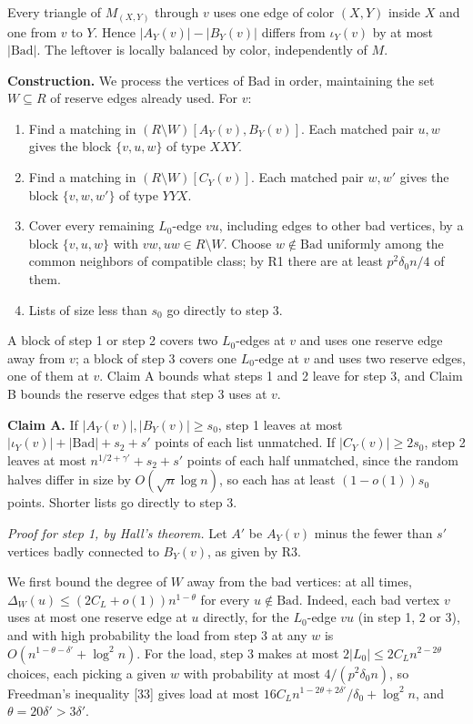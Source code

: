 \documentclass[english,11pt,a4paper]{article}
\providecommand{\tightlist}{\setlength{\itemsep}{0pt}\setlength{\parskip}{0pt}}
\begin{document}
Every triangle of \(M_{(X,Y)}\) through \(v\) uses one edge of color \((X,Y)\) inside \(X\) and one from \(v\) to \(Y\). Hence \(|A_Y(v)|-|B_Y(v)|\) differs from \(\iota_Y(v)\) by at most \(|\mathrm{Bad}|\). The leftover is locally balanced by color, independently of \(M\).

\textbf{Construction.} We process the vertices of \(\mathrm{Bad}\) in order, maintaining the set \(W\subseteq R\) of reserve edges already used. For \(v\):

\begin{enumerate}
\def\labelenumi{\arabic{enumi}.}
\tightlist
\item
  Find a matching in \((R\setminus W)[A_Y(v),B_Y(v)]\). Each matched pair \(u,w\) gives the block \(\{v,u,w\}\) of type \(XXY\).
\item
  Find a matching in \((R\setminus W)[C_Y(v)]\). Each matched pair \(w,w'\) gives the block \(\{v,w,w'\}\) of type \(YYX\).
\item
  Cover every remaining \(L_0\)-edge \(vu\), including edges to other bad vertices, by a block \(\{v,u,w\}\) with \(vw,uw\in R\setminus W\). Choose \(w\notin\mathrm{Bad}\) uniformly among the common neighbors of compatible class; by R1 there are at least \(p^2\delta_0n/4\) of them.
\item
  Lists of size less than \(s_0\) go directly to step 3.
\end{enumerate}

A block of step 1 or step 2 covers two \(L_0\)-edges at \(v\) and uses one reserve edge away from \(v\); a block of step 3 covers one \(L_0\)-edge at \(v\) and uses two reserve edges, one of them at \(v\). Claim A bounds what steps 1 and 2 leave for step 3, and Claim B bounds the reserve edges that step 3 uses at \(v\).

\textbf{Claim A.} If \(|A_Y(v)|,|B_Y(v)|\ge s_0\), step 1 leaves at most \(|\iota_Y(v)|+|\mathrm{Bad}|+s_2+s'\) points of each list unmatched. If \(|C_Y(v)|\ge2s_0\), step 2 leaves at most \(n^{1/2+\gamma'}+s_2+s'\) points of each half unmatched, since the random halves differ in size by \(O(\sqrt n\log n)\), so each has at least \((1-o(1))s_0\) points. Shorter lists go directly to step 3.

\emph{Proof for step 1, by Hall's theorem.} Let \(A'\) be \(A_Y(v)\) minus the fewer than \(s'\) vertices badly connected to \(B_Y(v)\), as given by R3.

We first bound the degree of \(W\) away from the bad vertices: at all times, \(\Delta_W(u)\le(2C_L+o(1))n^{1-\theta}\) for every \(u\notin\mathrm{Bad}\). Indeed, each bad vertex \(v\) uses at most one reserve edge at \(u\) directly, for the \(L_0\)-edge \(vu\) (in step 1, 2 or 3), and with high probability the load from step 3 at any \(w\) is \(O(n^{1-\theta-\delta'}+\log^2n)\). For the load, step 3 makes at most \(2|L_0|\le2C_Ln^{2-2\theta}\) choices, each picking a given \(w\) with probability at most \(4/(p^2\delta_0n)\), so Freedman's inequality {[}33{]} gives load at most \(16C_Ln^{1-2\theta+2\delta'}/\delta_0+\log^2n\), and \(\theta=20\delta'>3\delta'\).
\end{document}
